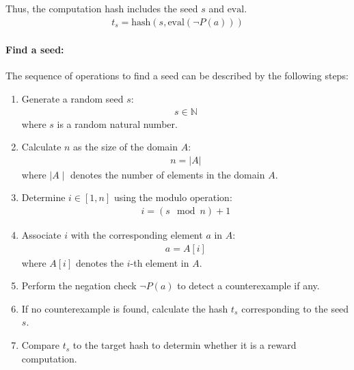 \documentclass[runningheads]{llncs}
\begin{document}
Thus, the computation hash includes the seed  \( s \) and \(\text{eval}\). 
\begin{align}
t_s = \text{hash}(s, \text{eval}(\neg P(a)))
\end{align}
\paragraph{Find a seed:}
The sequence of operations to find a seed can be described by the following steps:
\begin{enumerate}
\item Generate a random seed $s$: 
\begin{align}
s \in \mathbb{N} 
\end{align}
where $s$ is a random natural number.
\item Calculate $n$ as the size of the domain $A$: 
\begin{align}
n = |A|
\end{align}
where $\mid A \mid$ denotes the number of elements in the domain $A$.
\item Determine $i \in [1, n]$ using the modulo operation:
\begin{align}
i = (s \mod n) + 1
\end{align}
\item Associate \( i \) with the corresponding element $a$ in $A$:
\begin{align}
a=A[i]
\end{align}
where $A[i]$ denotes the $i$-th element in $A$.
\item Perform the negation check $\neg P(a)$ to detect a counterexample if any.

\item If no counterexample is found, calculate the hash \( t_s \) corresponding to the seed \( s \).
\item Compare \( t_s \) to the target hash to determin whether it is a reward computation.
\end{enumerate}
\end{document}
